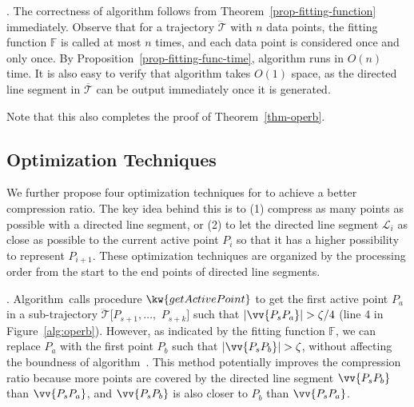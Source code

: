 {\vspace{-1ex}
. The correctness of algorithm \operb follows from  Theorem~\ref{prop-fitting-function} immediately.
 Observe that for a trajectory $\dddot{\mathcal{T}}$ with $n$ data points, the fitting function $\mathbb{F}$ is called at most $n$ times, and each data point is considered once and only once. By Proposition~\ref{prop-fitting-func-time}, algorithm \operb runs in $O(n)$ time.
It is also easy to verify that algorithm \operb takes $O(1)$ space, as the directed line segment in $\overline{\mathcal{T}}$ can be output immediately once it is generated.

Note that this also completes the proof of Theorem~\ref{thm-operb}.


\subsection{Optimization Techniques}
\label{subsec-optimizations}

We further propose four optimization techniques for \operb to achieve a better compression ratio. The key idea behind this is to (1) compress as many points as possible with a directed line segment, or (2) to let the directed line segment $\mathcal{L}_i$ as close as possible to the current active point $P_i$ so that it has a higher possibility to represent $P_{i+1}$. These optimization techniques are organized by the processing order from the start to the end points of directed line segments.

. Algorithm~\operb calls procedure $\kw{getActivePoint}$ to get the first active point $P_a$ in a sub-trajectory $\dddot{\mathcal{T}}[P_{s+1}, \ldots,$ $P_{s+k}]$ such that $|\vv{P_sP_{a}}|>\zeta/4$ (line 4 in Figure~\ref{alg:operb}).
However, as indicated by the fitting function $\mathbb{F}$, we can replace $P_a$ with the first point $P_{b}$ such that $|\vv{P_sP_{b}}|>\zeta$, without affecting the boundness of algorithm~\operb.
This method potentially improves the compression ratio because more points are covered by the directed line segment $\vv{P_sP_b}$ than $\vv{P_sP_a}$,
and $\vv{P_sP_b}$ is also closer to $P_b$ than $\vv{P_sP_a}$.


}
